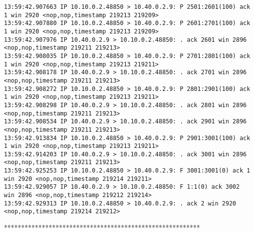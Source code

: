 \documentclass[a4paper,12pt]{article}
\begin{document}
\begin{lstlisting}
13:59:42.907663 IP 10.10.0.2.48850 > 10.40.0.2.9: P 2501:2601(100) ack 1 win 2920 <nop,nop,timestamp 219213 219209>
13:59:42.907880 IP 10.10.0.2.48850 > 10.40.0.2.9: P 2601:2701(100) ack 1 win 2920 <nop,nop,timestamp 219213 219209>
13:59:42.907976 IP 10.40.0.2.9 > 10.10.0.2.48850: . ack 2601 win 2896 <nop,nop,timestamp 219211 219213>
13:59:42.908035 IP 10.10.0.2.48850 > 10.40.0.2.9: P 2701:2801(100) ack 1 win 2920 <nop,nop,timestamp 219213 219211>
13:59:42.908178 IP 10.40.0.2.9 > 10.10.0.2.48850: . ack 2701 win 2896 <nop,nop,timestamp 219211 219213>
13:59:42.908272 IP 10.10.0.2.48850 > 10.40.0.2.9: P 2801:2901(100) ack 1 win 2920 <nop,nop,timestamp 219213 219211>
13:59:42.908298 IP 10.40.0.2.9 > 10.10.0.2.48850: . ack 2801 win 2896 <nop,nop,timestamp 219211 219213>
13:59:42.908534 IP 10.40.0.2.9 > 10.10.0.2.48850: . ack 2901 win 2896 <nop,nop,timestamp 219211 219213>
13:59:42.913834 IP 10.10.0.2.48850 > 10.40.0.2.9: P 2901:3001(100) ack 1 win 2920 <nop,nop,timestamp 219213 219211>
13:59:42.914203 IP 10.40.0.2.9 > 10.10.0.2.48850: . ack 3001 win 2896 <nop,nop,timestamp 219211 219213>
13:59:42.925253 IP 10.10.0.2.48850 > 10.40.0.2.9: F 3001:3001(0) ack 1 win 2920 <nop,nop,timestamp 219214 219211>
13:59:42.929057 IP 10.40.0.2.9 > 10.10.0.2.48850: F 1:1(0) ack 3002 win 2896 <nop,nop,timestamp 219212 219214>
13:59:42.929313 IP 10.10.0.2.48850 > 10.40.0.2.9: . ack 2 win 2920 <nop,nop,timestamp 219214 219212>
\end{lstlisting}

*********************************************************
\end{document}

